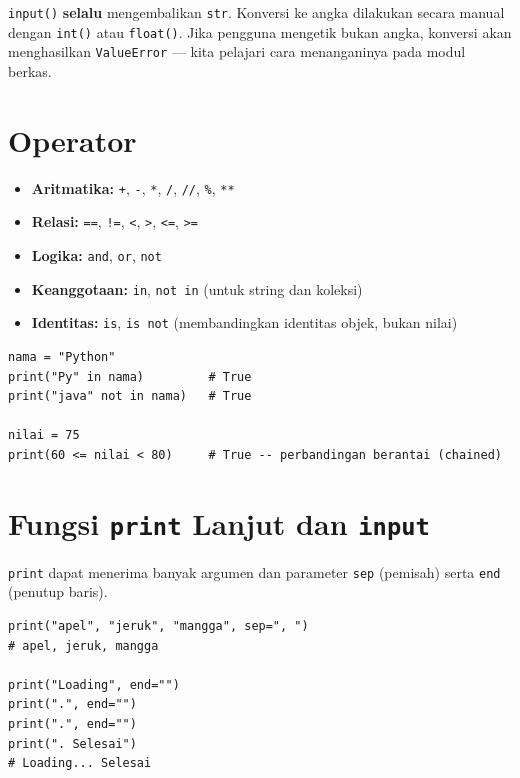 \documentclass[../main.tex]{subfiles}
\begin{document}
\begin{catatan}
\texttt{input()} \textbf{selalu} mengembalikan \texttt{str}. Konversi ke angka dilakukan secara manual dengan \texttt{int()} atau \texttt{float()}. Jika pengguna mengetik bukan angka, konversi akan menghasilkan \texttt{ValueError} --- kita pelajari cara menanganinya pada modul berkas.
\end{catatan}

\section{Operator}

\begin{itemize}[leftmargin=*]
  \item \textbf{Aritmatika:} \texttt{+}, \texttt{-}, \texttt{*}, \texttt{/}, \texttt{//}, \texttt{\%}, \texttt{**}
  \item \textbf{Relasi:} \texttt{==}, \texttt{!=}, \texttt{<}, \texttt{>}, \texttt{<=}, \texttt{>=}
  \item \textbf{Logika:} \texttt{and}, \texttt{or}, \texttt{not}
  \item \textbf{Keanggotaan:} \texttt{in}, \texttt{not in} (untuk string dan koleksi)
  \item \textbf{Identitas:} \texttt{is}, \texttt{is not} (membandingkan identitas objek, bukan nilai)
\end{itemize}

\begin{lstlisting}[caption=Operator in dan chained comparison]
nama = "Python"
print("Py" in nama)         # True
print("java" not in nama)   # True

nilai = 75
print(60 <= nilai < 80)     # True -- perbandingan berantai (chained)
\end{lstlisting}

\section{Fungsi \texttt{print} Lanjut dan \texttt{input}}

\texttt{print} dapat menerima banyak argumen dan parameter \texttt{sep} (pemisah) serta \texttt{end} (penutup baris).

\begin{lstlisting}[caption=Parameter print: sep dan end]
print("apel", "jeruk", "mangga", sep=", ")
# apel, jeruk, mangga

print("Loading", end="")
print(".", end="")
print(".", end="")
print(". Selesai")
# Loading... Selesai
\end{lstlisting}
\end{document}
